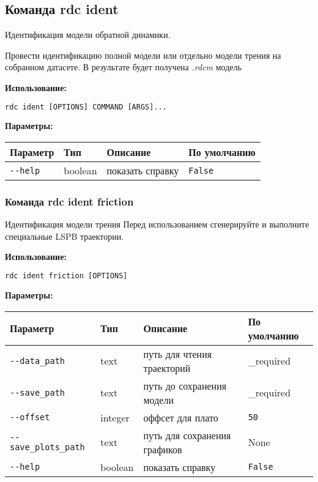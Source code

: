 \hypertarget{rdc-ident}{%
\subsection{Команда rdc ident}\label{rdc-ident}}

Идентификация модели обратной динамики.

Провести идентификацию полной модели или отдельно модели трения на собранном датасете. В результате будет получена \textit{.rdcm} модель

\textbf{Использование:}
\begin{lstlisting}[language=python, numbers=none, frame=single]
rdc ident [OPTIONS] COMMAND [ARGS]...
\end{lstlisting}

\textbf{Параметры:}
\begin{center}
\fontsize{10pt}{10pt}\selectfont
\begin{longtable}[]{p{5cm}|p{2cm}|p{3.5cm}|p{5cm}}
    \hline
\toprule()
Параметр & Тип & Описание & По умолчанию \\
\hline
\midrule()
\endhead
\texttt{-\/-help} & boolean & показать справку &
\texttt{False} \\
\bottomrule()
\hline
\end{longtable}
\end{center}

\hypertarget{rdc-ident-friction}{%
\subsubsection{ Команда rdc ident friction}\label{rdc-ident-friction}}
Идентификация модели трения
Перед использованием сгенерируйте и выполните специальные LSPB траектории.

\textbf{Использование:}
\begin{lstlisting}[language=python, numbers=none, frame=single]
rdc ident friction [OPTIONS]
\end{lstlisting}

\textbf{Параметры:}
\begin{center}
\fontsize{10pt}{10pt}\selectfont
\begin{longtable}[]{p{5cm}|p{2cm}|p{3.5cm}|p{5cm}}
    \hline
\toprule()
Параметр & Тип & Описание & По умолчанию \\
\hline
\midrule()
\endhead
\texttt{-\/-data\_path} & text & путь для чтения траекторий &
\_required \\
\hline
\texttt{-\/-save\_path} & text & путь до сохранения модели & \_required \\
\hline
\texttt{-\/-offset} & integer & оффсет для плато & \texttt{50} \\
\hline
\texttt{-\/-save\_plots\_path} & text & путь для сохранения графиков & None \\
\hline
\texttt{-\/-help} & boolean & показать справку &
\texttt{False} \\
\hline
\bottomrule()
\hline
\end{longtable}
\end{center}

